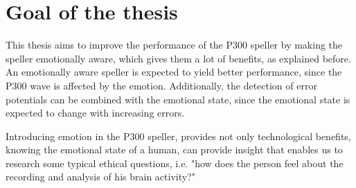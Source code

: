 \clearpage

\section{Goal of the thesis}

This thesis aims to improve the performance of the P300 speller by making the speller emotionally aware, which gives them a lot of benefits, as explained before. An emotionally aware speller is expected to yield better performance, since the P300 wave is affected by the emotion. Additionally, the detection of error potentials can be combined with the emotional state, since the emotional state is expected to change with increasing errors.

\npar

Introducing emotion in the P300 speller, provides not only technological benefits, knowing the emotional state of a human, can provide insight that enables us to research some typical ethical questions, i.e. "how does the person feel about the recording and analysis of his brain activity?"